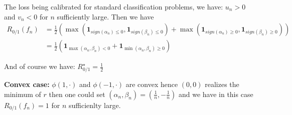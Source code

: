 \begin{prv*}
The loss being calibrated for standard classification problems, we have: $u_n>0$ and $v_n<0$ for $n$ sufficiently large. Then we have
\begin{align*}
    R_{0/1}(f_n) &= \frac12 \left(\max(\mathbf{1}_{sign(\alpha_n)\leq0},\mathbf{1}_{sign(\beta_n)\leq0})+\max(\mathbf{1}_{sign(\alpha_n)\geq0},\mathbf{1}_{sign(\beta_n)\geq0})\right)\\
    & =\frac12 \left(\mathbf{1}_{\max(\alpha_n,\beta_n)<0}+\mathbf{1}_{\min(\alpha_n,\beta_n)\geq0}\right)
\end{align*}

And of course we have: $R_{0/1}^\star=\frac12$

\textbf{Convex case:} $\phi(1,\cdot)$ and $\phi(-1,\cdot)$ are convex hence $(0,0)$ realizes the minimum of $r$ then one could set $(\alpha_n,\beta_n)=(\frac1n,-\frac1n)$ and we have in this case $R_{0/1}(f_n)=1$ for $n$ sufficienlty large. 
\end{prv*}
